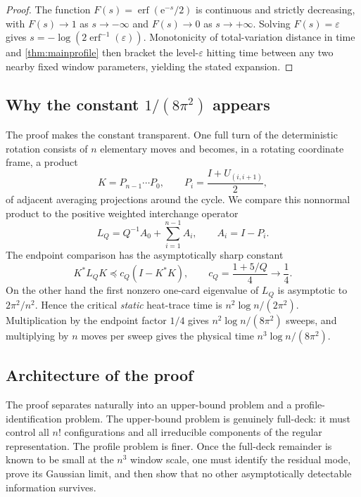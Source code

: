 \documentclass[11pt]{article}
\theoremstyle{remark}
\newcommand{\erf}{\operatorname{erf}}
\newcommand{\ee}{\mathrm e}
\begin{document}
\begin{proof}
The function $F(s)=\erf(\ee^{-s}/2)$ is continuous and strictly decreasing, with $F(s)\to1$ as $s\to-\infty$ and $F(s)\to0$ as $s\to+\infty$.  Solving $F(s)=\varepsilon$ gives
$s=-\log(2\erf^{-1}(\varepsilon))$.  Monotonicity of total-variation distance in time and \cref{thm:mainprofile} then bracket the level-$\varepsilon$ hitting time between any two nearby fixed window parameters, yielding the stated expansion.
\end{proof}

\subsection{Why the constant $1/(8\pi^2)$ appears}
The proof makes the constant transparent.  One full turn of the deterministic rotation consists of $n$ elementary moves and becomes, in a rotating coordinate frame, a product
\[
 K=P_{n-1}\cdots P_0,
 \qquad P_i=\frac{I+U_{(i,i+1)}}2,
\]
of adjacent averaging projections around the cycle.  We compare this nonnormal product to the positive weighted interchange operator
\[
 L_Q=Q^{-1}A_0+\sum_{i=1}^{n-1}A_i,
 \qquad A_i=I-P_i.
\]
The endpoint comparison has the asymptotically sharp constant
\[
 K^*L_QK\preceq c_Q(I-K^*K),
 \qquad c_Q=\frac{1+5/Q}{4}\longrightarrow\frac14.
\]
On the other hand the first nonzero one-card eigenvalue of $L_Q$ is asymptotic to $2\pi^2/n^2$.  Hence the critical \emph{static} heat-trace time is $n^2\log n/(2\pi^2)$.  Multiplication by the endpoint factor $1/4$ gives $n^2\log n/(8\pi^2)$ sweeps, and multiplying by $n$ moves per sweep gives the physical time $n^3\log n/(8\pi^2)$.

\subsection{Architecture of the proof}\label{sec:overview}
The proof separates naturally into an upper-bound problem and a profile-identification problem.  The upper-bound problem is genuinely full-deck: it must control all $n!$ configurations and all irreducible components of the regular representation.  The profile problem is finer.  Once the full-deck remainder is known to be small at the $n^3$ window scale, one must identify the residual mode, prove its Gaussian limit, and then show that no other asymptotically detectable information survives.
\end{document}

